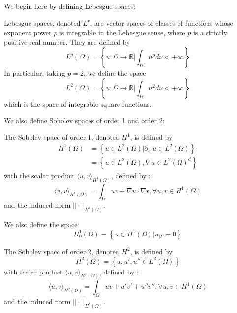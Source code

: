 We begin here by defining Lebesgue spaces:

\begin{Def}
	Lebesgue spaces, denoted $L^p$, are vector spaces of classes of functions whose exponent power $p$ is integrable in the Lebesgue sense, where $p$ is a strictly positive real number. They are defined by
	\begin{equation*}
		L^p(\Omega)=\left\{u:\Omega\rightarrow\mathbb{R}|\int_\Omega u^p d\nu<+\infty\right\}
	\end{equation*}
	In particular, taking $p=2$, we define the space
	\begin{equation*}
		L^2(\Omega)=\left\{u:\Omega\rightarrow\mathbb{R}|\int_\Omega u^2 d\nu<+\infty\right\}
	\end{equation*}
	which is the space of integrable square functions.
\end{Def}

We also define Sobolev spaces of order 1 and order 2:

\begin{Def}
	The Sobolev space of order 1, denoted $H^1$, is defined by
	\begin{align*}
		H^1(\Omega)&=\left\{u\in L^2(\Omega)|\partial_{x_i}u\in L^2(\Omega)\right\} \\
		&=\left\{u\in L^2(\Omega),\nabla u\in L^2(\Omega)^d\right\}
	\end{align*}
	with the scalar product $\langle u, v\rangle_{H^1(\Omega)}$, defined by :
	\begin{equation*}
		\langle u, v\rangle_{H^1(\Omega)} = \int_\Omega uv + \nabla u \cdot \nabla v, \forall u,v\in H^1(\Omega)
	\end{equation*}
	and the induced norm $||\cdot||_{H^1(\Omega)}$.
	
	We also define the space
	\begin{equation*}
		H_0^1(\Omega)=\left\{u\in H^1(\Omega)|u_{|\Gamma}=0\right\}
	\end{equation*}
	
	The Sobolev space of order 2, denoted $H^2$, is defined by
	\begin{equation*}
		H^2(\Omega)=\left\{u,u',u''\in L^2(\Omega)\right\}
	\end{equation*}
	with scalar product $\langle u, v\rangle_{H^2(\Omega)}$, defined by :
	\begin{equation*}
		\langle u, v\rangle_{H^2(\Omega)} = \int_\Omega uv + u'v' + u''v'', \forall u,v\in H^1(\Omega)
	\end{equation*}
	and the induced norm $||\cdot||_{H^2(\Omega)}$.
\end{Def}

